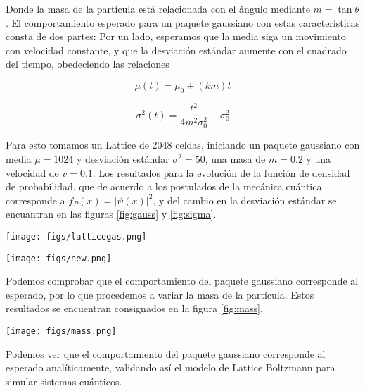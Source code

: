 \documentclass[12pts, letterpaper]{article}
\begin{document}
Donde la masa de la partícula está relacionada con el ángulo  mediante $m=\tan{\theta}$. 
El comportamiento esperado para un paquete gaussiano con estas características consta de 
dos partes: Por un lado, esperamos que la media siga un movimiento con velocidad 
constante, y que la desviación estándar aumente con el cuadrado del tiempo, obedeciendo 
las relaciones

\begin{equation*}
    \mu(t)=\mu_0+(km)t
\end{equation*}

\begin{equation*}
    \sigma^2(t)=\frac{t^2}{4m^2\sigma_0^2} + \sigma_0^2
\end{equation*}

Para esto tomamos un Lattice de 2048 celdas, iniciando un paquete gaussiano con media 
$\mu=1024$ y desviación estándar $\sigma^2=50$, una masa de $m=0.2$ y una velocidad de 
$v=0.1$. Los resultados para la evolución de la función de densidad de probabilidad, que 
de acuerdo a los postulados de la mecánica cuántica corresponde a $f_P(x)=|\psi(x)|^2$, y 
del cambio en la desviación estándar se encuantran en las figuras \ref{fig:gauss} y 
\ref{fig:sigma}.

\begin{figure*}[h]
    \centering
    \texttt{[image: figs/latticegas.png]}
    \caption{Evolución del paquete gaussiano para $t=0, 1000, 2000$ pasos de tiempo.}
    \label{fig:gauss}
\end{figure*}

\begin{figure*}[h]
    \centering
    \texttt{[image: figs/new.png]}
    \caption{Evolución de la desvación estándar en funcion del tiempo.}
    \label{fig:sigma}
\end{figure*}

Podemos comprobar que el comportamiento del paquete gaussiano corresponde al esperado, por 
lo que procedemos a variar la masa de la partícula. Estos resultados se encuentran 
consignados en la figura \ref{fig:mass}.

\begin{figure*}[h]
    \centering
    \texttt{[image: figs/mass.png]}
    \caption{Cambio de la desvación estándar en funcion del tiempo para diferentes masas.}
    \label{fig:mass}
\end{figure*}

Podemos ver que el comportamiento del paquete gaussiano corresponde al esperado 
analíticamente, validando así el modelo de Lattice Boltzmann para simular sistemas 
cuánticos.
\end{document}

